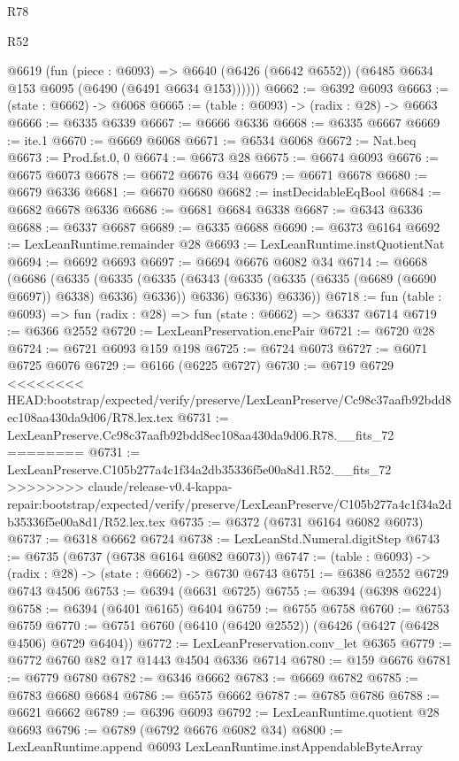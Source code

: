 \begin{lexlean}{R78}
\begin{lexlean}{R52}
\begin{coremodule}
{{{{{{{{{{{{{{{{{{{{{{{{{{{{{{{{{{{{{{{{{{{{{{{{{{{{{{{{{{{{{{{{{{{{{{{{{{{{{{{{{{{{{{{{{{{{{{{{{{{{{{{{{{{{{{{{{{{{{{{{{{{{{{{{{{{{{{{{{{{{{{{{{{{{{{{{{{{{{{{{{{{{{{{{{{{{{{{{{{{{{{{{{{{{{{{{{{{{{{      @6619
        (fun (piece : @6093) =>
        @6640 (@6426 (@6642 @6552)) (@6485 @6634 @153 @6095 (@6490 (@6491 @6634 @153))))))
@6662 := @6392 @6093
@6663 := (state : @6662) -> @6068
@6665 := (table : @6093) -> (radix : @28) -> @6663
@6666 := @6335 @6339
@6667 := @6666 @6336
@6668 := @6335 @6667
@6669 := ite.{1}
@6670 := @6669 @6068
@6671 := @6534 @6068
@6672 := Nat.beq
@6673 := Prod.fst.{0, 0}
@6674 := @6673 @28
@6675 := @6674 @6093
@6676 := @6675 @6073
@6678 := @6672 @6676 @34
@6679 := @6671 @6678
@6680 := @6679 @6336
@6681 := @6670 @6680
@6682 := instDecidableEqBool
@6684 := @6682 @6678 @6336
@6686 := @6681 @6684 @6338
@6687 := @6343 @6336
@6688 := @6337 @6687
@6689 := @6335 @6688
@6690 := @6373 @6164
@6692 := LexLeanRuntime.remainder @28
@6693 := LexLeanRuntime.instQuotientNat
@6694 := @6692 @6693
@6697 := @6694 @6676 @6082 @34
@6714 := @6668
    (@6686
      (@6335
        (@6335
          (@6335 (@6343 (@6335 (@6335 (@6335 (@6689 (@6690 @6697)) @6338) @6336) @6336)) @6336)
          @6336)
        @6336))
@6718 := fun (table : @6093) => fun (radix : @28) => fun (state : @6662) => @6337 @6714
@6719 := @6366 @2552
@6720 := LexLeanPreservation.encPair
@6721 := @6720 @28
@6724 := @6721 @6093 @159 @198
@6725 := @6724 @6073
@6727 := @6071 @6725 @6076
@6729 := @6166 (@6225 @6727)
@6730 := @6719 @6729
<<<<<<<< HEAD:bootstrap/expected/verify/preserve/LexLeanPreserve/Cc98c37aafb92bdd8ec108aa430da9d06/R78.lex.tex
@6731 := LexLeanPreserve.Cc98c37aafb92bdd8ec108aa430da9d06.R78.__fits_72
========
@6731 := LexLeanPreserve.C105b277a4c1f34a2db35336f5e00a8d1.R52.__fits_72
>>>>>>>> claude/release-v0.4-kappa-repair:bootstrap/expected/verify/preserve/LexLeanPreserve/C105b277a4c1f34a2db35336f5e00a8d1/R52.lex.tex
@6735 := @6372 (@6731 @6164 @6082 @6073)
@6737 := @6318 @6662 @6724
@6738 := LexLeanStd.Numeral.digitStep
@6743 := @6735 (@6737 (@6738 @6164 @6082 @6073))
@6747 := (table : @6093) -> (radix : @28) -> (state : @6662) -> @6730 @6743
@6751 := @6386 @2552 @6729 @6743 @4506
@6753 := @6394 (@6631 @6725)
@6755 := @6394 (@6398 @6224)
@6758 := @6394 (@6401 @6165) @6404
@6759 := @6755 @6758
@6760 := @6753 @6759
@6770 := @6751 @6760 (@6410 (@6420 @2552)) (@6426 (@6427 (@6428 @4506) @6729 @6404))
@6772 := LexLeanPreservation.conv_let @6365
@6779 := @6772 @6760 @82 @17 @1443 @4504 @6336 @6714
@6780 := @159 @6676
@6781 := @6779 @6780
@6782 := @6346 @6662
@6783 := @6669 @6782
@6785 := @6783 @6680 @6684
@6786 := @6575 @6662
@6787 := @6785 @6786
@6788 := @6621 @6662
@6789 := @6396 @6093
@6792 := LexLeanRuntime.quotient @28 @6693
@6796 := @6789 (@6792 @6676 @6082 @34)
@6800 := LexLeanRuntime.append @6093 LexLeanRuntime.instAppendableByteArray
}}}}}}}}}}}}}}}}}}}}}}}}}}}}}}}}}}}}}}}}}}}}}}}}}}}}}}}}}}}}}}}}}}}}}}}}}}}}}}}}}}}}}}}}}}}}}}}}}}}}}}}}}}}}}}}}}}}}}}}}}}}}}}}}}}}}}}}}}}}}}}}}}}}}}}}}}}}}}}}}}}}}}}}}}}}}}}}}}}}}}}}}}}}}}}}}}}}}}}
\end{coremodule}
\end{lexlean}
\end{lexlean}
